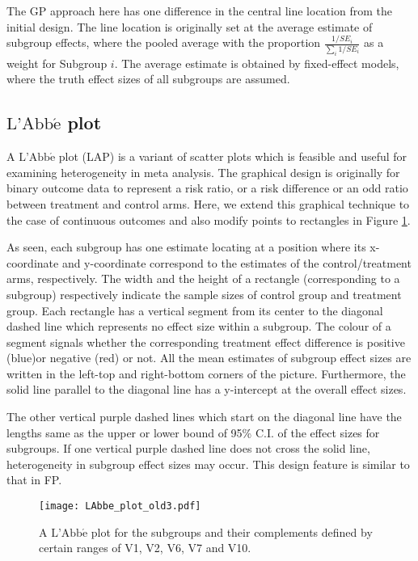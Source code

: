 \documentclass[Afour,sagev,times, doublespace]{sagej}
\begin{document}
{ The GP approach here has one difference in the central line location from the initial design. The line location is originally set at the average estimate of subgroup effects, where the pooled average with the proportion $\frac{1/SE_i}{\sum_i 1/SE_i}$ as a weight for Subgroup $i$. The average estimate is obtained by fixed-effect models, where the truth effect sizes of all subgroups are assumed. %

\subsection{$\text{L'Abb}\acute{\text{e}}$ plot}


A $\text{L'Abb}\acute{\text{e}}$ plot (LAP) \cite{LAbbe:88} is a variant of scatter plots which is feasible and useful for examining heterogeneity in meta analysis. The graphical design is originally for binary outcome data to represent a risk ratio, or a risk difference or an odd ratio between treatment and control arms. Here, we extend this graphical technique to the case of continuous outcomes and also modify points to rectangles in Figure \ref{fig:LAP}.

As seen, each subgroup has one estimate locating at a position where its x-coordinate and y-coordinate correspond to the estimates of the control/treatment arms, respectively. The width and the height of a rectangle (corresponding to a subgroup) respectively indicate the sample sizes of control group and treatment group. Each rectangle has a vertical segment from its center to the diagonal dashed line which represents no effect size within a subgroup. The colour of a segment signals whether the corresponding treatment effect difference is positive (blue)or negative (red) or not. All the mean estimates of subgroup effect sizes are written in the left-top and right-bottom corners of the picture. Furthermore, the solid line parallel to the diagonal line has a y-intercept at the overall effect sizes. %

The other vertical purple dashed lines which start on the diagonal line have the lengths same as the upper or lower bound of 95\% C.I. of the effect sizes for subgroups.  If one vertical purple dashed line does not cross the solid line, heterogeneity in subgroup effect sizes may occur. This design feature is similar to that in FP.

\begin{figure}
\begin{center}
		\texttt{[image: LAbbe\_plot\_old3.pdf]} \\
		\caption{A $\text{L'Abb}\acute{\text{e}}$ plot for the subgroups and their complements defined by certain ranges of  V1, V2, V6, V7 and V10. }\label{fig:LAP}
\end{center}
\end{figure}

}
\end{document}
